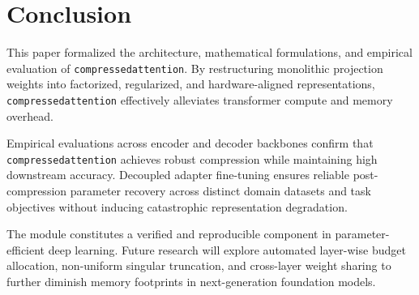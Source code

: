 \section{Conclusion}
This paper formalized the architecture, mathematical formulations, and empirical evaluation of \texttt{compressedattention}. By restructuring monolithic projection weights into factorized, regularized, and hardware-aligned representations, \texttt{compressedattention} effectively alleviates transformer compute and memory overhead.

Empirical evaluations across encoder and decoder backbones confirm that \texttt{compressedattention} achieves robust compression while maintaining high downstream accuracy. Decoupled adapter fine-tuning ensures reliable post-compression parameter recovery across distinct domain datasets and task objectives without inducing catastrophic representation degradation.

The module constitutes a verified and reproducible component in parameter-efficient deep learning. Future research will explore automated layer-wise budget allocation, non-uniform singular truncation, and cross-layer weight sharing to further diminish memory footprints in next-generation foundation models.
